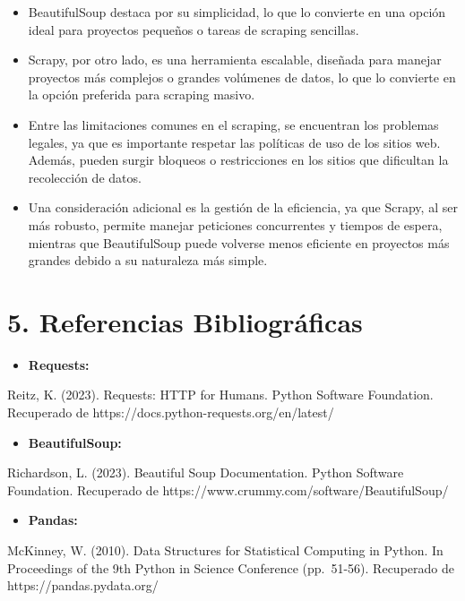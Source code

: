 \documentclass[
  letterpaper,
  DIV=11,
  numbers=noendperiod]{scrartcl}
\providecommand{\tightlist}{%
  \setlength{\itemsep}{0pt}\setlength{\parskip}{0pt}}\usepackage{longtable,booktabs,array}
\begin{document}
\begin{itemize}
\item
  BeautifulSoup destaca por su simplicidad, lo que lo convierte en una
  opción ideal para proyectos pequeños o tareas de scraping sencillas.
\item
  Scrapy, por otro lado, es una herramienta escalable, diseñada para
  manejar proyectos más complejos o grandes volúmenes de datos, lo que
  lo convierte en la opción preferida para scraping masivo.
\item
  Entre las limitaciones comunes en el scraping, se encuentran los
  problemas legales, ya que es importante respetar las políticas de uso
  de los sitios web. Además, pueden surgir bloqueos o restricciones en
  los sitios que dificultan la recolección de datos.
\item
  Una consideración adicional es la gestión de la eficiencia, ya que
  Scrapy, al ser más robusto, permite manejar peticiones concurrentes y
  tiempos de espera, mientras que BeautifulSoup puede volverse menos
  eficiente en proyectos más grandes debido a su naturaleza más simple.
\end{itemize}

\section{5. Referencias
Bibliográficas}\label{referencias-bibliogruxe1ficas}

\begin{itemize}
\tightlist
\item
  \textbf{Requests:}
\end{itemize}

Reitz, K. (2023). Requests: HTTP for Humans. Python Software Foundation.
Recuperado de https://docs.python-requests.org/en/latest/

\begin{itemize}
\tightlist
\item
  \textbf{BeautifulSoup:}
\end{itemize}

Richardson, L. (2023). Beautiful Soup Documentation. Python Software
Foundation. Recuperado de https://www.crummy.com/software/BeautifulSoup/

\begin{itemize}
\tightlist
\item
  \textbf{Pandas:}
\end{itemize}

McKinney, W. (2010). Data Structures for Statistical Computing in
Python. In Proceedings of the 9th Python in Science Conference
(pp.~51-56). Recuperado de https://pandas.pydata.org/
\end{document}
